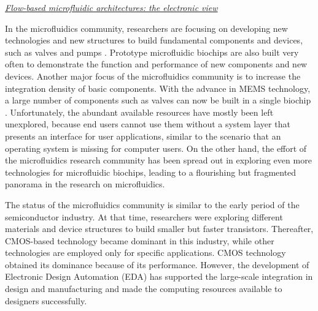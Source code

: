 \vskip 8pt
\textit{\underline{Flow-based microfluidic architectures: the electronic view}}

In the microfluidics community, researchers are focusing on developing new
technologies and new structures to build fundamental components and devices,
such as valves and pumps
\cite{Unger113,mathies2010multiplexed}.
Prototype microfluidic biochips are also built very often %
to demonstrate the function and performance of new
components and new devices.
Another major focus of the microfluidics community is to
increase the integration density of basic components. With the advance in MEMS
technology, a large number of components such as valves can now be built in a
single biochip \cite{C2LC40258K}. 
Unfortunately, the abundant available resources 
have mostly been left unexplored, because end users cannot use them 
without a system layer that presents an interface for user applications,
similar to the scenario that an operating system is missing 
for computer users. On the other hand, 
the effort of the microfluidics research community
has been spread out in exploring even 
more technologies for microfluidic biochips, 
leading to a flourishing but fragmented panorama in the research on
microfluidics. 

The %
status of
the microfluidics community is similar to the early
period of the semiconductor industry. At that time, researchers
were exploring different materials and device structures to build smaller but
faster transistors. Thereafter, CMOS-based technology became dominant
in this industry, while other technologies are 
employed only for specific applications. 
CMOS technology obtained its dominance because of
its performance. 
However, the development of Electronic Design Automation (EDA) has 
supported the large-scale integration in design and manufacturing and
made the computing resources available to designers successfully.
 
